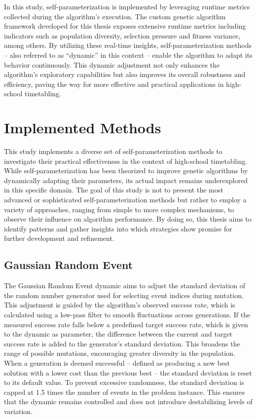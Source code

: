 \documentclass[english,examples]{isasthesis}
\begin{document}
In this study, self-parameterization is implemented by leveraging runtime
metrics collected during the algorithm's execution. The custom genetic algorithm
framework developed for this thesis exposes extensive runtime metrics including
indicators such as population diversity, selection pressure and fitness
variance, among others. By utilizing these real-time insights,
self-parameterization methods -- also referred to as \enquote{dynamic} in this
context -- enable the algorithm to adapt its behavior continuously. This
dynamic adjustment not only enhances the algorithm's exploratory capabilities
but also improves its overall robustness and efficiency, paving the way for
more effective and practical applications in high-school timetabling.

\section{Implemented Methods}
This study implements a diverse set of self-parameterization methods to
investigate their practical effectiveness in the context of high-school
timetabling. While self-parameterization has been theorized to improve genetic
algorithms by dynamically adapting their parameters, its actual impact remains
underexplored in this specific domain. The goal of this study is not to present
the most advanced or sophisticated self-parameterization methods but rather to
employ a variety of approaches, ranging from simple to more complex mechanisms,
to observe their influence on algorithm performance. By doing so, this thesis
aims to identify patterns and gather insights into which strategies show
promise for further development and refinement.

\subsection{Gaussian Random Event}
\label{GaussianRandomEvent}
The Gaussian Random Event dynamic aims to adjust the standard deviation of the
random number generator used for selecting event indices during mutation. This
adjustment is guided by the algorithm's observed success rate, which is
calculated using a low-pass filter to smooth fluctuations across generations.
If the measured success rate falls below a predefined target success rate,
which is given to the dynamic as parameter, the difference between the current
and target success rate is added to the generator's standard deviation.
This broadens the range of possible mutations, encouraging greater diversity in
the population.
%
When a generation is deemed successful -- defined as producing a new
best solution with a lower cost than the previous best -- the standard deviation
is reset to its default value. To prevent excessive randomness, the standard
deviation is capped at 1.5 times the number of events in the problem instance.
This ensures that the dynamic remains controlled and does not introduce
destabilizing levels of variation.
\end{document}
